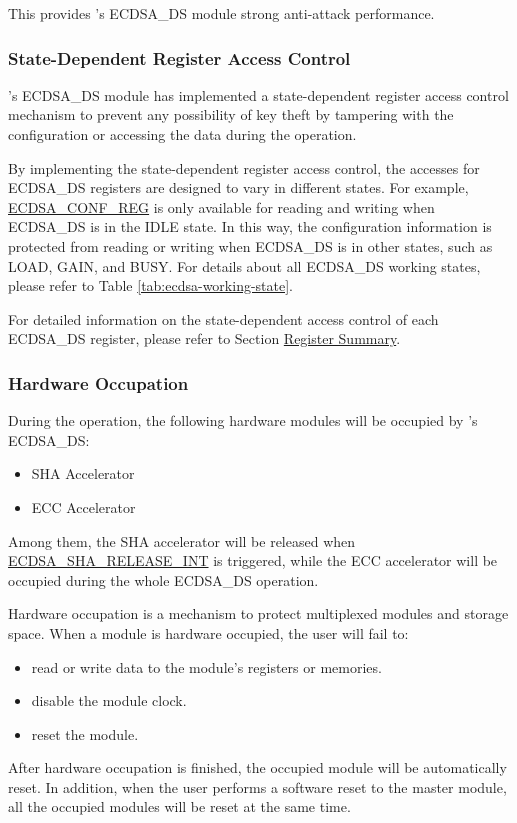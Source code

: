 \documentclass[main\_\_EN.tex]{subfiles}
\begin{document}
This provides \chipseries{}'s ECDSA\_DS module strong anti-attack performance.

\subsubsection{State-Dependent Register Access Control}

\chipseries{}'s ECDSA\_DS module has implemented a state-dependent register access control mechanism to prevent any possibility of key theft by tampering with the configuration or accessing the data during the operation.

By implementing the state-dependent register access control, the accesses for ECDSA\_DS registers are designed to vary in different states. For example, \hyperref[regdesc:ECDSACONFREG]{ECDSA\_CONF\_REG} is only available for reading and writing when ECDSA\_DS is in the IDLE state. In this way, the configuration information is protected from reading or writing when ECDSA\_DS is in other states, such as LOAD, GAIN, and BUSY. For details about all ECDSA\_DS working states, please refer to Table \ref{tab:ecdsa-working-state}.

For detailed information on the state-dependent access control of each ECDSA\_DS register, please refer to Section \hyperref[sec:ecdsa-reg-summ]{Register Summary}.

\subsubsection{Hardware Occupation}

During the operation, the following hardware modules will be occupied by \chipname{}'s ECDSA\_DS:
\begin{itemize}
    \item SHA Accelerator
    \item ECC Accelerator
\end{itemize}
Among them, the SHA accelerator will be released when \hyperref[int:ECDSASHARELEASEINT]{ECDSA\_SHA\_RELEASE\_INT} is triggered, while the ECC accelerator will be occupied during the whole ECDSA\_DS operation.

\begin{tiplisting}
Hardware occupation is a mechanism to protect multiplexed modules and storage space. When a module is hardware occupied, the user will fail to:
\vspace{-0.5em}
\begin{itemize}
    \item read or write data to the module's registers or memories.
    \item disable the module clock.
    \item reset the module.
\end{itemize}
\vspace{-0.5em}
After hardware occupation is finished, the occupied module will be automatically reset. In addition, when the user performs a software reset to the master module, all the occupied modules will be reset at the same time.
\end{tiplisting}
\end{document}
